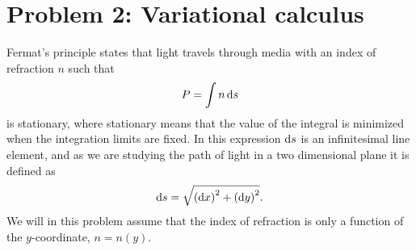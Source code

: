 \documentclass[12pt,twoside]{article}
\begin{document}
\section*{Problem 2: Variational calculus}
Fermat's principle states that light travels through media with an index of refraction $n$ such that
\begin{equation}
  P = \int n \dif s
\end{equation}
is stationary, where stationary means that the value of the integral is minimized when the integration limits are fixed. In this expression $\dif s$ is an infinitesimal line element, and as we are studying the path of light in a two dimensional plane it is defined as
\begin{equation}
  \dif s = \sqrt{\left(\dif x\right)^2 + \left(\dif y\right)^2}. \label{s}
\end{equation}
We will in this problem assume that the index of refraction is only a function of the $y$-coordinate, $n=n(y)$.
\end{document}
